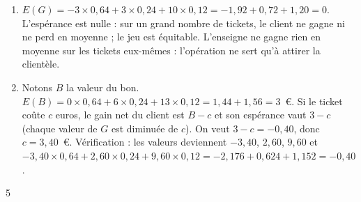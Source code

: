 {\begin{enumerate}
\[\begin{array}{|l|c|c|c|}
\end{array}
\]
Contrôle : $0{,}64+0{,}24+0{,}12=1$.
\item $E(G)=-3\times0{,}64+3\times0{,}24+10\times0{,}12=-1{,}92+0{,}72+1{,}20=0$.
L'espérance est nulle : sur un grand nombre de tickets, le client ne gagne ni ne perd en moyenne ; le jeu est équitable. L'enseigne ne gagne rien en moyenne sur les tickets eux-mêmes : l'opération ne sert qu'à attirer la clientèle.
\item Notons $B$ la valeur du bon. $E(B)=0\times0{,}64+6\times0{,}24+13\times0{,}12=1{,}44+1{,}56=3$~€. Si le ticket coûte $c$ euros, le gain net du client est $B-c$ et son espérance vaut $3-c$ (chaque valeur de $G$ est diminuée de $c$). On veut $3-c=-0{,}40$, donc $c=3{,}40$~€.
Vérification : les valeurs deviennent $-3{,}40$, $2{,}60$, $9{,}60$ et $-3{,}40\times0{,}64+2{,}60\times0{,}24+9{,}60\times0{,}12=-2{,}176+0{,}624+1{,}152=-0{,}40$.
\end{enumerate}
}{5}

